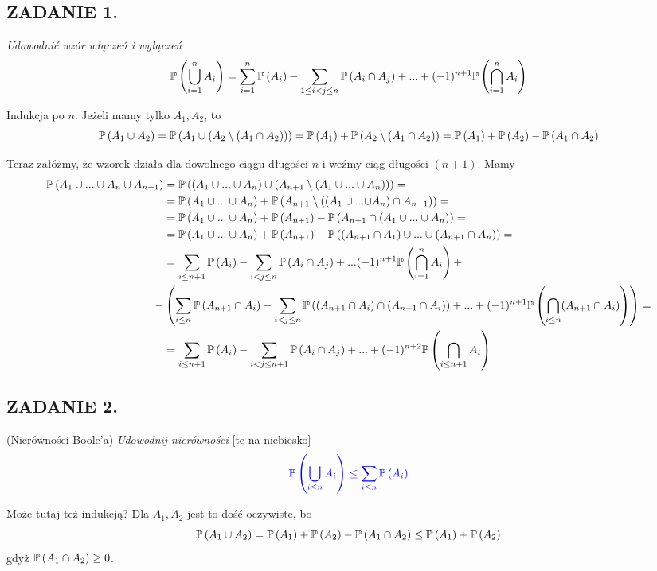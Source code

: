 \documentclass{article}
\begin{document}
\subsection*{ZADANIE 1.}
\emph{Udowodnić wzór włączeń i wyłączeń}
$$\mathbb{P}\left(\bigcup\limits_{i=1}^nA_i\right)=\sum\limits_{i=1}^n\mathbb{P}\left(A_i\right)-\sum\limits_{1\leq i<j\leq n}\mathbb{P}\left(A_i\cap A_j\right)+...+(-1)^{n+1}\mathbb{P}\left(\bigcap\limits_{i=1}^n A_i\right)$$

Indukcja po $n$. Jeżeli mamy tylko $A_1, A_2$, to
$$\mathbb{P}\left(A_1\cup A_2\right)=\mathbb{P}\left(A_1\cup (A_2\setminus(A_1\cap A_2))\right)=\mathbb{P}\left(A_1\right)+\mathbb{P}\left(A_2\setminus(A_1\cap A_2)\right)=\mathbb{P}\left(A_1\right)+\mathbb{P}\left(A_2\right)-\mathbb{P}\left(A_1\cap A_2\right)$$

Teraz załóżmy, że wzorek działa dla dowolnego ciągu długości $n$ i weźmy ciąg długości $(n+1)$. Mamy
\begin{align*}
    \mathbb{P}\left(A_1\cup...\cup A_n\cup A_{n+1}\right)&=\mathbb{P}\left((A_1\cup...\cup A_n)\cup(A_{n+1}\setminus(A_1\cup...\cup A_n))\right)=\\
    &=\mathbb{P}\left(A_1\cup...\cup A_n\right)+\mathbb{P}\left(A_{n+1}\setminus(({A_1\cup...\cup}A_n)\cap A_{n+1})\right)=\\
    &=\mathbb{P}\left(A_1\cup...\cup A_n\right)+\mathbb{P}\left(A_{n+1}\right)-\mathbb{P}\left(A_{n+1}\cap(A_1\cup...\cup A_n)\right)=\\
    &=\mathbb{P}\left(A_1\cup...\cup A_n\right)+\mathbb{P}\left(A_{n+1}\right)-\mathbb{P}\left((A_{n+1}\cap A_1)\cup...\cup(A_{n+1}\cap A_n)\right)=\\
    &=\sum\limits_{i\leq n+1}\mathbb{P}\left(A_i\right)-\sum\limits_{i<j\leq n}\mathbb{P}\left(A_i\cap A_j\right)+...(-1)^{n+1}\mathbb{P}\left(\bigcap\limits_{i=1}^n A_i\right)+\\
    -&\left(\sum\limits_{i\leq n}\mathbb{P}\left(A_{n+1}\cap A_i\right)-\sum\limits_{i<j\leq n}\mathbb{P}\left((A_{n+1}\cap A_i)\cap (A_{n+1}\cap A_i)\right)+...+(-1)^{n+1}\mathbb{P}\left(\bigcap\limits_{i\leq n}(A_{n+1}\cap A_i)\right)\right)=\\
    &=\sum\limits_{i\leq n+1}\mathbb{P}\left(A_i\right)-\sum\limits_{i<j\leq n+1}\mathbb{P}\left(A_i\cap A_j\right)+...+(-1)^{n+2}\mathbb{P}\left(\bigcap\limits_{i\leq n+1}A_i\right)
\end{align*}

\subsection*{ZADANIE 2.}
(Nierówności Boole'a) \emph{Udowodnij nierówności} [te na {\color{blue}niebiesko}]
$$\color{blue}\mathbb{P}\left(\bigcup\limits_{i\leq n}A_i\right)\leq\sum\limits_{i\leq n}\mathbb{P}\left(A_i\right)$$

Może tutaj też indukcją? Dla $A_1, A_2$ jest to dość oczywiste, bo
$$\mathbb{P}\left(A_1\cup A_2\right)=\mathbb{P}\left(A_1\right)+\mathbb{P}\left(A_2\right)-\mathbb{P}\left(A_1\cap A_2\right)\leq \mathbb{P}\left(A_1\right)+\mathbb{P}\left(A_2\right)$$
gdyż $\mathbb{P}\left(A_1\cap A_2\right)\geq0$.
\end{document}
